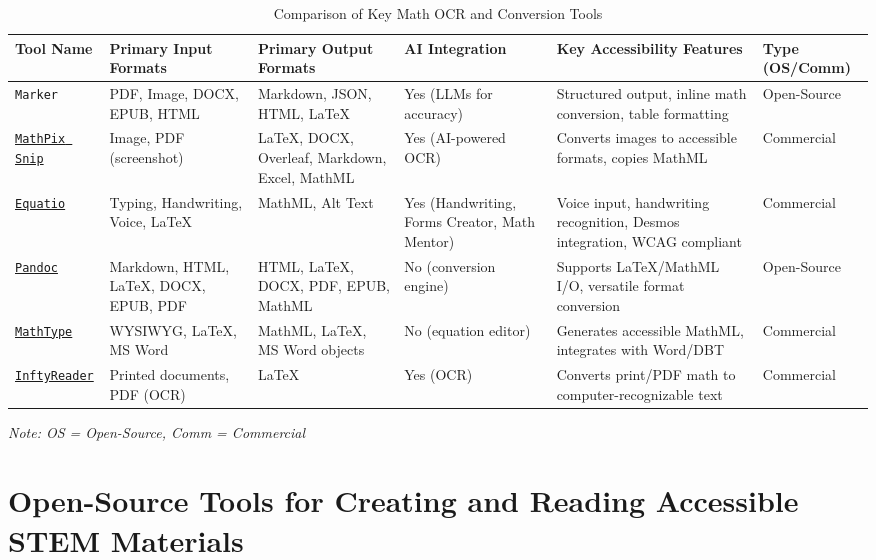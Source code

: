 \begin{table}[htbp]
    \centering
    \caption{Comparison of Key Math OCR and Conversion Tools}
    \label{tab:math_ocr_conversion_tools}
    \begin{tabular}{|p{2.5cm}|p{3cm}|p{3cm}|p{1.5cm}|p{3.5cm}|p{2cm}|}
        \hline
        \textbf{Tool Name} & \textbf{Primary Input Formats} & \textbf{Primary Output Formats} & \textbf{AI Integration} & \textbf{Key Accessibility Features} & \textbf{Type (OS/Comm)} \\
        \hline
        \texttt{Marker} & PDF, Image, DOCX, EPUB, HTML & Markdown, JSON, HTML, LaTeX & Yes (LLMs for accuracy) & Structured output, inline math conversion, table formatting & Open-Source \\
        \hline
        \href{https://mathpix.com/}{\texttt{MathPix Snip}} & Image, PDF (screenshot) & LaTeX, DOCX, Overleaf, Markdown, Excel, MathML & Yes (AI-powered OCR) & Converts images to accessible formats, copies MathML & Commercial \\
        \hline
        \href{https://www.texthelp.com/products/equatio/}{\texttt{Equatio}} & Typing, Handwriting, Voice, LaTeX & MathML, Alt Text & Yes (Handwriting, Forms Creator, Math Mentor) & Voice input, handwriting recognition, Desmos integration, WCAG compliant & Commercial \\
        \hline
        \href{https://pandoc.org/}{\texttt{Pandoc}} & Markdown, HTML, LaTeX, DOCX, EPUB, PDF & HTML, LaTeX, DOCX, PDF, EPUB, MathML & No (conversion engine) & Supports LaTeX/MathML I/O, versatile format conversion & Open-Source \\
        \hline
        \href{https://www.wiris.com/en/}{\texttt{MathType}} & WYSIWYG, LaTeX, MS Word & MathML, LaTeX, MS Word objects & No (equation editor) & Generates accessible MathML, integrates with Word/DBT & Commercial \\
        \hline
        \href{http://www.sciaccess.net/en/InftyReader/index.html}{\texttt{InftyReader}} & Printed documents, PDF (OCR) & LaTeX & Yes (OCR) & Converts print/PDF math to computer-recognizable text & Commercial \\
        \hline
    \end{tabular}
    \vspace{0.5em}
    \footnotesize{\textit{Note: OS = Open-Source, Comm = Commercial}}
\end{table}

\section{Open-Source Tools for Creating and Reading Accessible STEM Materials}

